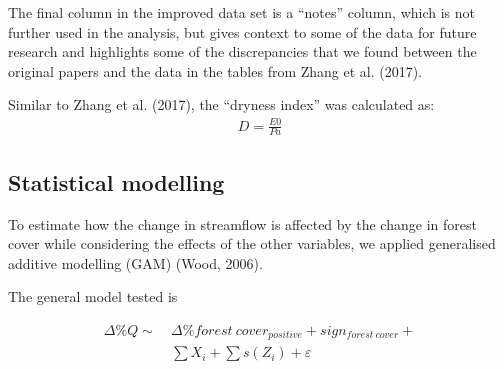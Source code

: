 \documentclass[]{elsarticle} %
\newenvironment{Shaded}{\begin{snugshade}}{\end{snugshade}}
\newcommand{\DataTypeTok}[1]{\textcolor[rgb]{0.13,0.29,0.53}{#1}}
\newcommand{\DecValTok}[1]{\textcolor[rgb]{0.00,0.00,0.81}{#1}}
\newcommand{\KeywordTok}[1]{\textcolor[rgb]{0.13,0.29,0.53}{\textbf{#1}}}
\newcommand{\NormalTok}[1]{#1}
\newcommand{\OperatorTok}[1]{\textcolor[rgb]{0.81,0.36,0.00}{\textbf{#1}}}
\newcommand{\StringTok}[1]{\textcolor[rgb]{0.31,0.60,0.02}{#1}}
\begin{document}
The final column in the improved data set is a ``notes'' column, which
is not further used in the analysis, but gives context to some of the
data for future research and highlights some of the discrepancies that
we found between the original papers and the data in the tables from
Zhang et al. (2017).

Similar to Zhang et al. (2017), the ``dryness index'' was calculated as:
\[\tag{1}
\begin{aligned}
D = \frac{E0}{Pa}
\end{aligned}\]

\hypertarget{statistical-modelling}{%
\subsection{Statistical modelling}\label{statistical-modelling}}

\begin{Shaded}
\end{Shaded}

\begin{Shaded}
\end{Shaded}

To estimate how the change in streamflow is affected by the change in
forest cover while considering the effects of the other variables, we
applied generalised additive modelling (GAM) (Wood, 2006).

The general model tested is

\[\tag{2}
\begin{aligned}
\Delta \% Q \sim ~ &\Delta \% forest~cover_{positive} + sign_{forest~cover} + \\ & \sum{X_i} + \sum{s(Z_i)} + \varepsilon
\end{aligned}\]
\end{document}

